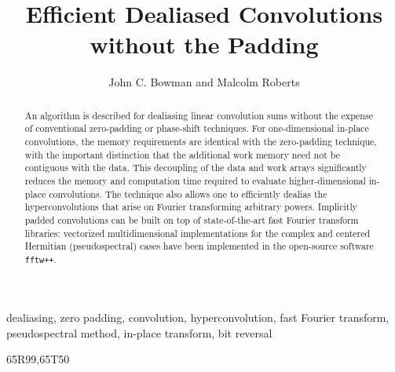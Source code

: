 \documentclass[final]{siamltex}
\begin{document}
\title{Efficient Dealiased Convolutions without the Padding}
\author{John C. Bowman and Malcolm Roberts}
\maketitle

\begin{abstract}
An algorithm is described for dealiasing linear convolution sums
without the expense of conventional zero-padding or phase-shift
techniques. For one-dimensional in-place convolutions, the memory
requirements are identical with the zero-padding technique, with the important
distinction that the additional work memory need not be contiguous with the
data. This decoupling of the data and work arrays significantly reduces
the memory and computation time required to evaluate higher-dimensional
in-place convolutions. The technique also allows one to efficiently dealias the
hyperconvolutions that arise on Fourier transforming arbitrary powers.
Implicitly padded convolutions can be built on top of state-of-the-art
fast Fourier transform libraries: vectorized multidimensional implementations
for the complex and centered Hermitian (pseudospectral) cases have
been implemented in the open-source software {\tt fftw++}.
\end{abstract} 

\begin{keywords} 
dealiasing, zero padding, convolution, hyperconvolution, fast Fourier transform,
pseudospectral method, in-place transform, bit reversal
\end{keywords}

\begin{AMS}
65R99,65T50
\end{AMS}

\pagestyle{myheadings}



% 


%


%
\end{document}

